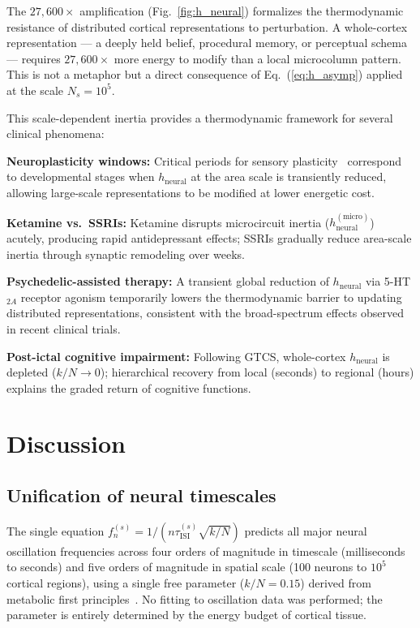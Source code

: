 \documentclass[aps,pre,twocolumn,showpacs,superscriptaddress,longbibliography]{revtex4-2}
\newcommand{\kN}{k/N}
\newcommand{\tauISI}{\tau_{\mathrm{ISI}}}
\newcommand{\hneu}{h_{\mathrm{neural}}}
\begin{document}
The $27{,}600\times$ amplification (Fig.~\ref{fig:h_neural})
formalizes the thermodynamic resistance of distributed cortical
representations to perturbation. A whole-cortex representation
--- a deeply held belief, procedural memory, or perceptual
schema --- requires $27{,}600\times$ more energy to modify than
a local microcolumn pattern. This is not a metaphor but a direct
consequence of Eq.~(\ref{eq:h_asymp}) applied at the scale
$N_s = 10^5$.

This scale-dependent inertia provides a thermodynamic framework
for several clinical phenomena:

\textbf{Neuroplasticity windows:} Critical periods for sensory
plasticity~\cite{Hensch2005} correspond to developmental stages
when $\hneu$ at the area scale is transiently reduced, allowing
large-scale representations to be modified at lower energetic
cost.

\textbf{Ketamine vs.\ SSRIs:} Ketamine disrupts microcircuit
inertia ($\hneu^{(\mathrm{micro})}$) acutely, producing rapid
antidepressant effects; SSRIs gradually reduce area-scale inertia
through synaptic remodeling over weeks.

\textbf{Psychedelic-assisted therapy:} A transient global
reduction of $\hneu$ via 5-HT$_{2A}$ receptor agonism
temporarily lowers the thermodynamic barrier to updating
distributed representations, consistent with the broad-spectrum
effects observed in recent clinical trials.

\textbf{Post-ictal cognitive impairment:} Following GTCS,
whole-cortex $\hneu$ is depleted ($\kN \to 0$); hierarchical
recovery from local (seconds) to regional (hours) explains
the graded return of cognitive functions.

\section{\label{sec:discussion}Discussion}

\subsection{Unification of neural timescales}

The single equation $f_n^{(s)} = 1/(n\tauISI^{(s)}\sqrt{\kN})$
predicts all major neural oscillation frequencies across four
orders of magnitude in timescale (milliseconds to seconds) and
five orders of magnitude in spatial scale (100 neurons to
$10^5$ cortical regions), using a single free parameter
($\kN = 0.15$) derived from metabolic first
principles~\cite{Attwell2001}. No fitting to oscillation data
was performed; the parameter is entirely determined by the
energy budget of cortical tissue.
\end{document}
